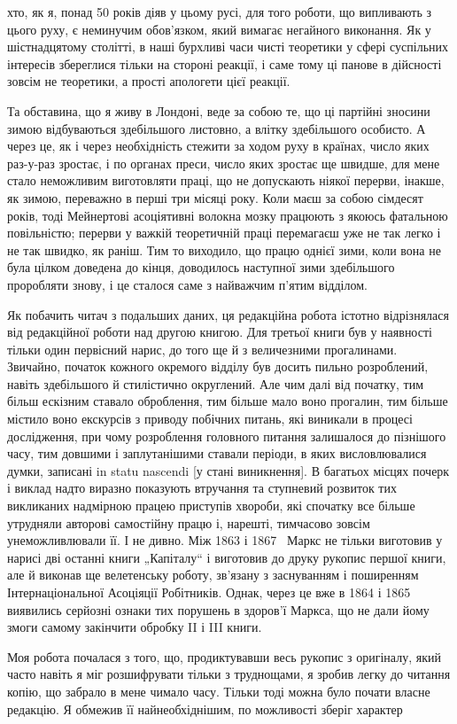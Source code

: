 \parcont{}  %
хто, як я, понад 50 років діяв у цьому русі, для того роботи,
що випливають з цього руху, є неминучим обов’язком, який
вимагає негайного виконання. Як у шістнадцятому столітті, в
наші бурхливі часи чисті теоретики у сфері суспільних інтересів
збереглися тільки на стороні реакції, і саме тому ці панове
в дійсності зовсім не теоретики, а прості апологети цієї реакції.

Та обставина, що я живу в Лондоні, веде за собою те, що
ці партійні зносини зимою відбуваються здебільшого листовно,
а влітку здебільшого особисто. А через це, як і через необхідність
стежити за ходом руху в країнах, число яких раз-у-раз
зростає, і по органах преси, число яких зростає ще швидше, для
мене стало неможливим виготовляти праці, що не допускають
ніякої перерви, інакше, як зимою, переважно в перші три місяці
року. Коли маєш за собою сімдесят років, тоді Мейнертові асоціятивні
волокна мозку працюють з якоюсь фатальною повільністю;
перерви у важкій теоретичній праці перемагаєш уже не так
легко і не так швидко, як раніш. Тим то виходило, що працю
однієї зими, коли вона не була цілком доведена до кінця, доводилось
наступної зими здебільшого проробляти знову, і це сталося
саме з найважчим п’ятим відділом.

Як побачить читач з подальших даних, ця редакційна робота
істотно відрізнялася від редакційної роботи над другою книгою.
Для третьої книги був у наявності тільки один первісний нарис,
до того ще й з величезними прогалинами. Звичайно, початок
кожного окремого відділу був досить пильно розроблений,
навіть здебільшого й стилістично округлений. Але чим далі від
початку, тим більш ескізним ставало оброблення, тим більше мало
воно прогалин, тим більше містило воно екскурсів з приводу побічних
питань, які виникали в процесі дослідження, при чому розроблення
головного питання залишалося до пізнішого часу, тим
довшими і заплутанішими ставали періоди, в яких висловлювалися
думки, записані in statu nascendi [у стані виникнення].
В багатьох місцях почерк і виклад надто виразно показують
втручання та ступневий розвиток тих викликаних надмірною
працею приступів хвороби, які спочатку все більше утрудняли
авторові самостійну працю і, нарешті, тимчасово зовсім унеможливлювали
її. І не дивно. Між 1863 і 1867~ Маркс не тільки
виготовив у нарисі дві останні книги „Капіталу“ і виготовив до
друку рукопис першої книги, але й виконав ще велетенську
роботу, зв’язану з заснуванням і поширенням Інтернаціональної
Асоціяції Робітників. Однак, через це вже в 1864 і 1865~
виявились серйозні ознаки тих порушень в здоров’ї Маркса, що
не дали йому змоги самому закінчити обробку II і III книги.

Моя робота почалася з того, що, продиктувавши весь рукопис
з оригіналу, який часто навіть я міг розшифрувати тільки з труднощами,
я зробив легку до читання копію, що забрало в мене
чимало часу. Тільки тоді можна було почати власне редакцію.
Я обмежив її найнеобхіднішим, по можливості зберіг характер
\parbreak{}  %
